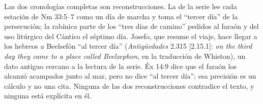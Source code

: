 \documentclass[11pt,letterpaper]{article}
\begin{document}
\begin{nota}[Precisión]
Las dos cronologías completas son reconstrucciones. La de la serie lee cada estación de Nm 33:5--7 como un día de marcha y toma el ``tercer día'' de la persecución; la rabínica parte de los ``tres días de camino'' pedidos al faraón y del uso litúrgico del Cántico el séptimo día. Josefo, que resume el viaje, hace llegar a los hebreos a Beelsefón ``al tercer día'' (\emph{Antigüedades} 2.315 [2.15.1]: \emph{on the third day they came to a place called Beelzephon}, en la traducción de Whiston), un dato antiguo cercano a la lectura de la serie. Éx 14:9 dice que el faraón los alcanzó acampados junto al mar, pero no dice ``al tercer día''; esa precisión es un cálculo y no una cita. Ninguna de las dos reconstrucciones contradice el texto, y ninguna está explícita en él.
\end{nota}
\end{document}
